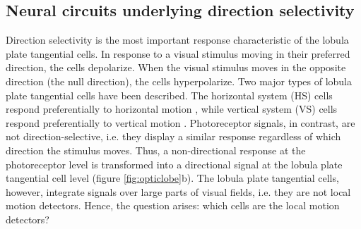 \subsection{Neural circuits underlying direction selectivity}
\label{sec:Neuralcircuits}
Direction selectivity is the most important response characteristic of the lobula plate tangential cells. In response to a visual stimulus moving in their preferred direction, the cells depolarize. When the visual stimulus moves in the opposite direction (the null direction), the cells hyperpolarize. Two major types of lobula plate tangential cells have been described. The horizontal system (HS) cells respond preferentially to horizontal motion \parencite{Schnell2010}, while vertical system (VS) cells respond preferentially to vertical motion \parencite{Joesch2008}. Photoreceptor signals, in contrast, are not direction-selective, i.e. they display a similar response regardless of which direction the stimulus moves. Thus, a non-directional response at the photoreceptor level is transformed into a directional signal at the lobula plate tangential cell level (figure \ref{fig:opticlobe}b). The lobula plate tangential cells, however, integrate signals over large parts of visual fields, i.e. they are not local motion detectors. Hence, the question arises: which cells are the local motion detectors? 



